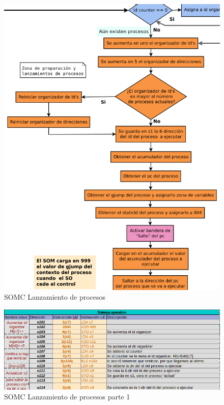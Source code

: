 \documentclass[letterpaper,12pt,oneside]{book}
\begin{document}
		
		\begin{figure}[h]		
			\centering
			\includegraphics[scale=0.48]{media/CARDIACC/diagLanzamientoProcesos.png}
			\caption{ SOMC Lanzamiento de procesos}
			\label{fig:diagLanzProce}
		\end{figure}
		
		
		\begin{figure}[h]		
			\centering
			\includegraphics[scale=0.55]{media/CARDIACC/SO_EjecutarProceso.png}
			\caption{ SOMC Lanzamiento de procesos parte 1}
			\label{fig:somcLanzamientoP1}
		\end{figure}
\end{document}
